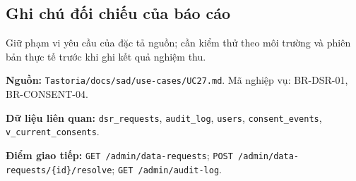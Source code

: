 \subsection{Ghi chú đối chiếu của báo cáo}
Giữ phạm vi yêu cầu của đặc tả nguồn; cần kiểm thử theo môi trường và phiên bản thực tế trước khi ghi kết quả nghiệm thu.

\textbf{Nguồn:} {\small\texttt{Tastoria/\allowbreak{}\allowbreak{}docs/\allowbreak{}\allowbreak{}sad/\allowbreak{}\allowbreak{}use-\allowbreak{}cases/\allowbreak{}\allowbreak{}UC27.\allowbreak{}md}}. Mã nghiệp vụ: BR-\allowbreak{}DSR-\allowbreak{}01, BR-\allowbreak{}CONSENT-\allowbreak{}04.

\textbf{Dữ liệu liên quan:} {\small\texttt{dsr\_\allowbreak{}\allowbreak{}requests}}, {\small\texttt{audit\_\allowbreak{}\allowbreak{}log}}, {\small\texttt{users}}, {\small\texttt{consent\_\allowbreak{}\allowbreak{}events}}, {\small\texttt{v\_\allowbreak{}\allowbreak{}current\_\allowbreak{}\allowbreak{}consents}}.

\textbf{Điểm giao tiếp:} {\small\texttt{GET /\allowbreak{}\allowbreak{}admin/\allowbreak{}\allowbreak{}data-\allowbreak{}requests}}; {\small\texttt{POST /\allowbreak{}\allowbreak{}admin/\allowbreak{}\allowbreak{}data-\allowbreak{}requests/\allowbreak{}\allowbreak{}\{id\}/\allowbreak{}\allowbreak{}resolve}}; {\small\texttt{GET /\allowbreak{}\allowbreak{}admin/\allowbreak{}\allowbreak{}audit-\allowbreak{}log}}.
